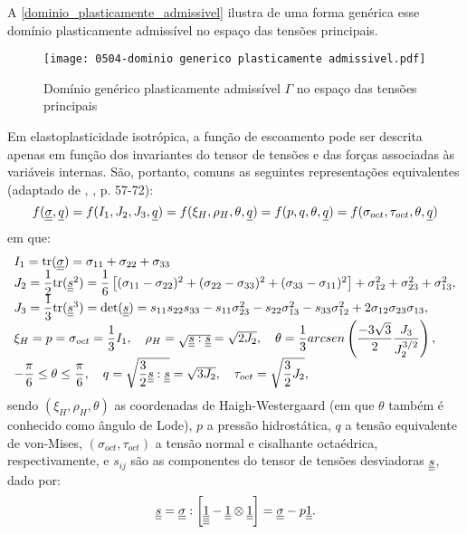 A \autoref{dominio_plasticamente_admissivel} ilustra de uma forma genérica esse domínio plasticamente admissível no espaço das tensões principais.
\begin{figure}[H]
	\begin{center}
		\texttt{[image: 0504-dominio generico plasticamente admissivel.pdf]}
	\end{center}
	\caption{\label{dominio_plasticamente_admissivel}Domínio genérico plasticamente admissível $\Gamma$ no espaço das tensões principais}
\end{figure}
Em elastoplasticidade isotrópica, a função de escoamento pode ser descrita apenas em função dos invariantes do tensor de tensões e das forças associadas às variáveis internas. São, portanto, comuns as seguintes representações equivalentes (adaptado de \citeauthor{Chen1988}, \citeyear{Chen1988}, p. 57-72):
\begin{equation}
	\label{eq:funcoes_escoamento}
	f(\underline{\underline \sigma},\underline q) = f(I_1,J_2,J_3,\underline q) = f(\xi_{H},\rho_{H},\theta,\underline q) = f(p,q,\theta,\underline q) = f(\sigma_{oct},\tau_{oct},\theta,\underline q)
\end{equation}
em que:
\begin{equation}
	\label{eq:invariantes_tensores}
		\begin{array}{lcl}
			I_1 = \text{tr}(\underline{\underline \sigma}) = \sigma_{11}+\sigma_{22}+\sigma_{33}\\
			J_2 = \dfrac{1}{2}\text{tr}(\underline{\underline s}^2) = \dfrac{1}{6}\left[ (\sigma_{11}-\sigma_{22})^2 + (\sigma_{22}-\sigma_{33})^2 + (\sigma_{33}-\sigma_{11})^2 \right] + \sigma_{12}^2+ \sigma_{23}^2+ \sigma_{13}^2, \\
			J_3 = \dfrac{1}{3}\text{tr}(\underline{\underline s}^3) = \text{det}(\underline{\underline s}) = s_{11}s_{22}s_{33}-s_{11}\sigma_{23}^2-s_{22}\sigma_{13}^2-s_{33}\sigma_{12}^2+2\sigma_{12}\sigma_{23}\sigma_{13}, \\ 
			\xi_{H} = p = \sigma_{oct} = \dfrac{1}{3}I_1, ~~~ \rho_{H} = \sqrt{\underline{\underline s}:\underline{\underline s}} = \sqrt{2J_2}, ~~~ \theta = \dfrac{1}{3}arcsen\left( \dfrac{-3\sqrt{3}}{2} \dfrac{J_3}{J_2^{3/2}} \right), \\
			-\dfrac{\pi}{6} \le \theta \le \dfrac{\pi}{6}, ~~~ q = \sqrt{\dfrac{3}{2}\underline{\underline s}:\underline{\underline s}} = \sqrt{3J_2}, ~~~ \tau_{oct} = \sqrt{\dfrac{3}{2}J_2},
	\end{array}
\end{equation}
sendo $(\xi_H,\rho_H,\theta)$ as coordenadas de Haigh-Westergaard (em que $\theta$ também é conhecido como ângulo de Lode), $p$ a pressão hidrostática, $q$ a tensão equivalente de von-Mises, $(\sigma_{oct},\tau_{oct})$ a tensão normal e cisalhante octaédrica, respectivamente, e $s_{ij}$ são as componentes do tensor de tensões desviadoras $\underline{\underline s}$, dado por:
\begin{equation}
	\label{eq:tensor_desviador}
	\underline{\underline s} = \underline{\underline \sigma}: \left[ \underline{\underline{\underline{\underline 1}}}-\underline{\underline 1} \otimes \underline{\underline 1} \right] = \underline{\underline \sigma} - p\underline{\underline 1}.
\end{equation}

